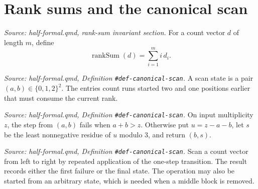 \chapter{Rank sums and the canonical scan}

\begin{definition}
  \label{def:rank_sum}
  \textit{Source: half-formal.qmd, rank-sum invariant section.}
  For a count vector \(d\) of length \(m\), define
  \[
    \operatorname{rankSum}(d)=\sum_{i=1}^{m}i\,d_i.
  \]
\end{definition}

\begin{definition}
  \label{def:scan_state}
  \textit{Source: half-formal.qmd, Definition \texttt{\#def-canonical-scan}.}
  A scan state is a pair \((a,b)\in\{0,1,2\}^2\).  The entries count
  runs started two and one positions earlier that must consume the current
  rank.
\end{definition}

\begin{definition}
  \label{def:scan_step}
  \textit{Source: half-formal.qmd, Definition \texttt{\#def-canonical-scan}.}
  On input multiplicity \(z\), the step from \((a,b)\) fails when
  \(a+b>z\).  Otherwise put \(u=z-a-b\), let \(s\) be the least
  nonnegative residue of \(u\) modulo \(3\), and return \((b,s)\).
\end{definition}

\begin{definition}
  \label{def:scan}
  \textit{Source: half-formal.qmd, Definition \texttt{\#def-canonical-scan}.}
  Scan a count vector from left to right by repeated application of the
  one-step transition.  The result records either the first failure or the
  final state.  The operation may also be started from an arbitrary state,
  which is needed when a middle block is removed.
\end{definition}

